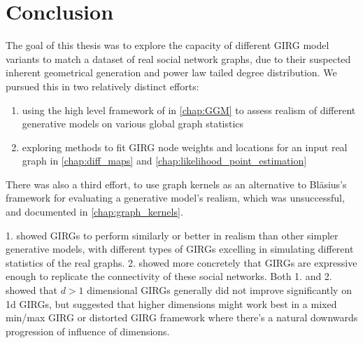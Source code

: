 \chapter{Conclusion}
The goal of this thesis was to explore the capacity of different GIRG model variants to match a dataset of real social network graphs, due to their suspected inherent geometrical generation and power law tailed degree distribution. We pursued this in two relatively distinct efforts:
\begin{enumerate}
    \item using the high level framework of \cite{blasius2018towards} in \cref{chap:GGM} to assess realism of different generative models on various global graph statistics
    \item exploring methods to fit GIRG node weights and locations for an input real graph in \cref{chap:diff_maps} and \cref{chap:likelihood_point_estimation}
\end{enumerate}
There was also a third effort, to use graph kernels as an alternative to Bl{\"a}sius's framework for evaluating a generative model's realism, which was unsuccessful, and documented in \cref{chap:graph_kernels}.

1. showed GIRGs to perform similarly or better in realism than other simpler generative models, with different types of GIRGs excelling in simulating different  statistics of the real graphs. 2. showed more concretely that GIRGs are expressive enough to replicate the connectivity of these social networks. Both 1. and 2. showed that $d > 1$ dimensional GIRGs generally did not improve significantly on 1d GIRGs, but suggested that higher dimensions might work best in a mixed min/max GIRG or distorted GIRG framework where there's a natural downwards progression of influence of dimensions.




